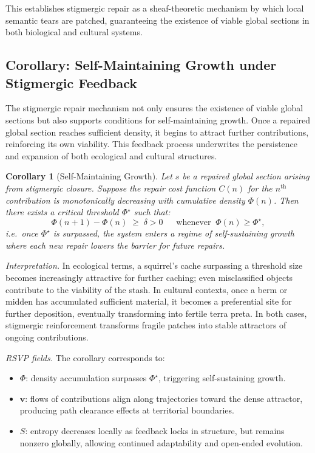\documentclass{article}
\newtheorem{corollary}{Corollary}
\begin{document}
This establishes stigmergic repair as a sheaf-theoretic mechanism by which local semantic tears are patched, guaranteeing the existence of viable global sections in both biological and cultural systems.

\subsection{Corollary: Self-Maintaining Growth under Stigmergic Feedback}

The stigmergic repair mechanism not only ensures the existence of viable global sections but also supports conditions for self-maintaining growth. Once a repaired global section reaches sufficient density, it begins to attract further contributions, reinforcing its own viability. This feedback process underwrites the persistence and expansion of both ecological and cultural structures.

\begin{corollary}[Self-Maintaining Growth]
Let $s$ be a repaired global section arising from stigmergic closure. Suppose the repair cost function $C(n)$ for the $n^{\text{th}}$ contribution is monotonically decreasing with cumulative density $\Phi(n)$. Then there exists a critical threshold $\Phi^\star$ such that:
\[
\Phi(n+1) - \Phi(n) \;\geq\; \delta > 0
\quad\;\;\text{whenever}\;\; \Phi(n) \geq \Phi^\star,
\]
i.e.\ once $\Phi^\star$ is surpassed, the system enters a regime of self-sustaining growth where each new repair lowers the barrier for future repairs.
\end{corollary}

\noindent
\emph{Interpretation.} In ecological terms, a squirrel’s cache surpassing a threshold size becomes increasingly attractive for further caching; even misclassified objects contribute to the viability of the stash. In cultural contexts, once a berm or midden has accumulated sufficient material, it becomes a preferential site for further deposition, eventually transforming into fertile terra preta. In both cases, stigmergic reinforcement transforms fragile patches into stable attractors of ongoing contributions.

\noindent
\emph{RSVP fields.} The corollary corresponds to:
\begin{itemize}
    \item $\Phi$: density accumulation surpasses $\Phi^\star$, triggering self-sustaining growth.
    \item $\mathbf{v}$: flows of contributions align along trajectories toward the dense attractor, producing path clearance effects at territorial boundaries.
    \item $S$: entropy decreases locally as feedback locks in structure, but remains nonzero globally, allowing continued adaptability and open-ended evolution.
\end{itemize}
\end{document}
